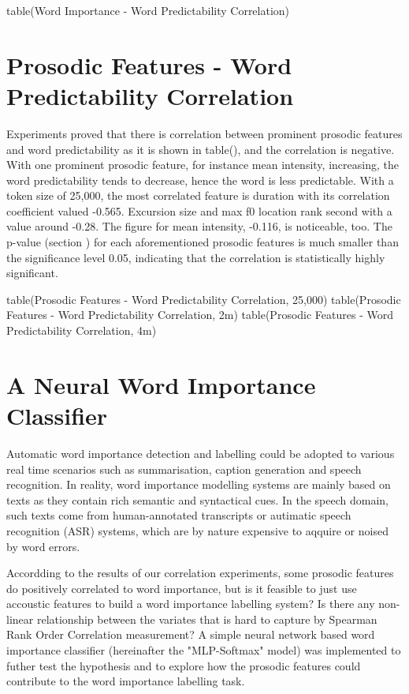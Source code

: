table(Word Importance - Word Predictability Correlation)

\section{Prosodic Features - Word Predictability Correlation}
Experiments proved that there is correlation between prominent prosodic features and word predictability as it is shown in table(), and the correlation is negative. With one prominent prosodic feature, for instance mean intensity, increasing, the word predictability tends to decrease, hence the word is less predictable. With a token size of 25,000, the most correlated feature is duration with its correlation coefficient valued -0.565. Excursion size and max f0 location rank second with a value around -0.28. The figure for mean intensity, -0.116, is noticeable, too. The p-value (section ) for each aforementioned prosodic features is much smaller than the significance level 0.05, indicating that the correlation is statistically highly significant.

table(Prosodic Features - Word Predictability Correlation, 25,000)
table(Prosodic Features - Word Predictability Correlation, 2m)
table(Prosodic Features - Word Predictability Correlation, 4m)

\section{A Neural Word Importance Classifier}
Automatic word importance detection and labelling could be adopted to various real time scenarios such as summarisation, caption generation and speech recognition. In reality, word importance modelling systems are mainly based on texts as they contain rich semantic and syntactical cues. In the speech domain, such texts come from human-annotated transcripts or autimatic speech recognition (ASR) systems, which are by nature expensive to aqquire or noised by word errors.

 Accordding to the results of our correlation experiments, some prosodic features do positively correlated to word importance, but is it feasible to just use accoustic features to build a word importance labelling system? Is there any non-linear relationship between the variates that is hard to capture by Spearman Rank Order Correlation measurement?  A simple neural network based word importance classifier (hereinafter the "MLP-Softmax" model) was implemented to futher test the hypothesis and to explore how the prosodic features could contribute to the word importance labelling task.
 
